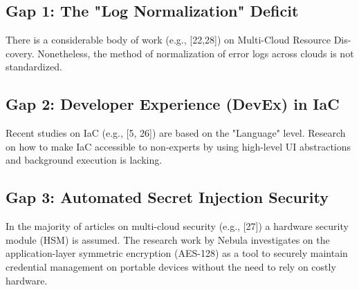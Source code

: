 \subsection{Gap 1: The "Log Normalization" Deficit}
There is a considerable body of work (e.g., [22,28]) on Multi-Cloud Resource Dis- covery. Nonetheless, the method of normalization of error logs across clouds is not standardized. 

\subsection{Gap 2: Developer Experience (DevEx) in IaC}
Recent studies on IaC (e.g., [5, 26]) are based on the "Language" level. Research on how to make IaC accessible to non-experts by using high-level UI abstractions and background execution is lacking.

\subsection{Gap 3: Automated Secret Injection Security}
In the majority of articles on multi-cloud security (e.g., [27]) a hardware security module (HSM) is assumed. The research work by Nebula investigates on the application-layer symmetric encryption (AES-128) as a tool to securely maintain credential management on portable devices without the need to rely on costly hardware.

\newpage

